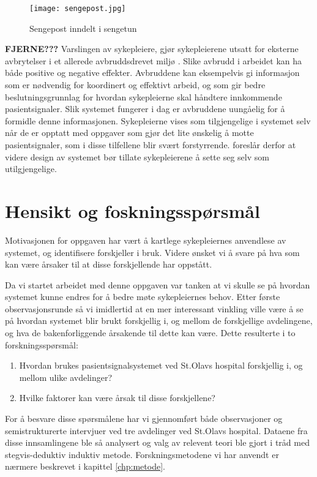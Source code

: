 \begin{figure}[H]
\centering
\texttt{[image: sengepost.jpg]}
\caption{Sengepost inndelt i sengetun \citep{Aslaksen}}
\label{fig:sengepost}
\end{figure}

\noindent
\textbf{FJERNE???} Varslingen av sykepleiere, gjør sykepleierene utsatt for eksterne avbrytelser i et allerede avbruddsdrevet miljø \citep{Klemets12}. Slike avbrudd i arbeidet kan ha både positive og negative effekter. Avbruddene kan eksempelvis gi informasjon som er nødvendig for koordinert og effektivt arbeid, og som gir bedre beslutningsgrunnlag for hvordan sykepleierne skal håndtere innkommende pasientsignaler. Slik systemet fungerer i dag er avbruddene uungåelig for å formidle denne informasjonen.
Sykepleierne vises som tilgjengelige i systemet selv når de er opptatt med oppgaver som gjør det lite ønskelig å motte pasientsignaler, som i disse tilfellene blir svært forstyrrende. \citet{KlemetsRedundancy} foreslår derfor at videre design av systemet bør tillate sykepleierene å sette seg selv som utilgjengelige. 

\section{Hensikt og foskningsspørsmål}
Motivasjonen for oppgaven har vært å kartlege sykepleiernes anvendlese av systemet, og identifisere forskjeller i bruk. Videre ønsket vi å svare på hva som kan være årsaker til at disse forskjellende har oppstått. 

\noindent
Da vi startet arbeidet med denne oppgaven var tanken at vi skulle se på hvordan systemet kunne endres for å bedre møte sykepleiernes behov. Etter første observasjonsrunde så vi imidlertid at en mer interessant vinkling ville være å se på hvordan systemet blir brukt forskjellig i, og mellom de forskjellige avdelingene, og hva de bakenforliggende årsakende til dette kan være. Dette resulterte i to forskningsspørsmål:

\begin{enumerate}
\item Hvordan brukes pasientsignalsystemet ved St.Olavs hospital forskjellig i, og mellom ulike avdelinger? 
\item Hvilke faktorer kan være årsak til disse forskjellene?
\end{enumerate}

\noindent
For å besvare disse spørsmålene har vi gjennomført både observasjoner og semistrukturerte intervjuer ved tre avdelinger ved St.Olavs hospital. Dataene fra disse innsamlingene ble så analysert og valg av relevent teori ble gjort i tråd med stegvis-deduktiv induktiv metode. Forskningsmetodene vi har anvendt er nærmere beskrevet i kapittel \ref{chp:metode}.

